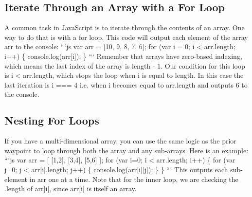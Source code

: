 \documentclass{article}%
\begin{document}
\subsection{Iterate Through an Array with a For Loop}%
\label{subsec:IterateThroughanArraywithaForLoop}%
A common task in JavaScript is to iterate through the contents of an array. One way to do that is with a for loop. This code will output each element of the array arr to the console:\newline%
```js\newline%
var arr = {[}10, 9, 8, 7, 6{]};\newline%
for (var i = 0; i < arr.length; i++) \{\newline%
   console.log(arr{[}i{]});\newline%
\}\newline%
```\newline%
Remember that arrays have zero{-}based indexing, which means the last index of the array is length {-} 1. Our condition for this loop is i < arr.length, which stops the loop when i is equal to length. In this case the last iteration is i === 4 i.e. when i becomes equal to arr.length and outputs 6 to the console.\newline%

%
\subsection{Nesting For Loops}%
\label{subsec:NestingForLoops}%
If you have a multi{-}dimensional array, you can use the same logic as the prior waypoint to loop through both the array and any sub{-}arrays. Here is an example:\newline%
```js\newline%
var arr = {[}\newline%
  {[}1,2{]}, {[}3,4{]}, {[}5,6{]}\newline%
{]};\newline%
for (var i=0; i < arr.length; i++) \{\newline%
  for (var j=0; j < arr{[}i{]}.length; j++) \{\newline%
    console.log(arr{[}i{]}{[}j{]});\newline%
  \}\newline%
\}\newline%
```\newline%
This outputs each sub{-}element in arr one at a time. Note that for the inner loop, we are checking the .length of arr{[}i{]}, since arr{[}i{]} is itself an array.\newline%
\end{document}
